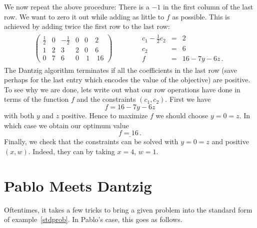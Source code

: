 \begin{example}
We now repeat the above procedure: There is a $-1$ in the first column of the last row. We want to zero it out while adding as little to
$f$ as possible. This is achieved by adding twice the first row to the last row:
\[
\begin{array}{c|c}
\left(
\begin{array}{rrrrr|r}
\frac12&0&-\frac12&0&0&2\\[1mm]
1&2&3&2&0&6\\\hline
0&7&6&0&\ 1&\ 16
\end{array}\right)
\quad\quad  &\quad 
\begin{array}{rcl}
c_1-\frac12 c_2&=&2\\[1mm]
c_2&=&6\\
f&=&16-7y-6z\, .
\end{array}
\end{array}
\]
The Dantzig algorithm terminates if all the coefficients in the last row (save perhaps for the last entry which encodes the value of the objective) are positive.
To see why we are done, lets write out what our row operations have done in terms of the function $f$ and the constraints $(c_1,c_2)$.
First we have
\[
f=16-7y-6z
\]
with both $y$ and $z$ positive. Hence to maximize $f$ we should choose $y=0=z$. In which case we obtain our optimum value
\[
\underline{f=16\, .}
\]
Finally, we check that the constraints can be solved with $y=0=z$ and positive $(x,w)$. Indeed, they can by taking $x=4$, $w=1$.
\end{example} 

\section{Pablo Meets Dantzig} 
Oftentimes, it takes a few tricks to bring a given problem into the standard  form of example~\ref{stdprob}. In Pablo's case, this goes as follows.

